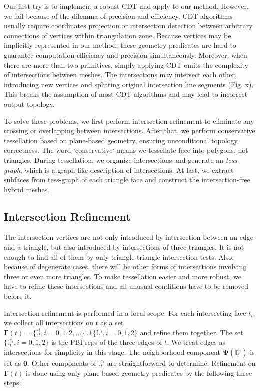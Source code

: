 \documentclass[10pt,journal,compsoc]{IEEEtran}
\begin{document}
Our first try is to implement a robust CDT and apply to our method. However, we fail because of the dilemma of precision and efficiency. CDT algorithms \cite{chew1989constrained,preparata2012computational} usually require coordinates projection or intersection detection between arbitrary connections of vertices within triangulation zone. Because vertices may be implicitly represented in our method, these geometry predicates are hard to guarantee computation efficiency and precision simultaneously. Moreover, when there are more than two primitives, simply applying CDT omits the complexity of intersections between meshes. The intersections may intersect each other, introducing new vertices and splitting original intersection line segments (Fig. x). This breaks the assumption of most CDT algorithms and may lead to incorrect output topology.

To solve these problems, we first perform intersection refinement to eliminate any crossing or overlapping between intersections. After that, we perform conservative tessellation based on plane-based geometry, ensuring unconditional topology correctness. The word `conservative` means we tessellate face into polygons, not triangles. During tessellation, we organize intersections and generate an \emph{tess-graph}, which is a graph-like description of intersections. At last, we extract subfaces from tess-graph of each triangle face and construct the intersection-free hybrid meshes.

\subsection{Intersection Refinement}


The intersection vertices are not only introduced by intersection between an edge and a triangle, but also introduced by intersections of three triangles. It is not enough to find all of them by only triangle-triangle intersection tests. Also, because of degenerate cases, there will be other forms of intersections involving three or even more triangles. To make tessellation easier and more robust, we have to refine these intersections and all unusual conditions have to be removed before it.

Intersection refinement is performed in a local scope. For each intersecting face $t_i$, we collect all intersections on $t$ as a set $\bm{\Gamma}(t)=\{\mathbb{I}_{t}^i, i=0,1,2,...\}\cup\{\mathbb{I}_{t}^{e_i},i=0,1,2\}$ and refine them together. The set $\{\mathbb{I}_{t}^{e_i},i=0,1,2\}$ is the PBI-reps of the three edges of $t$. We treat edges as intersections for simplicity in this stage. The neighborhood component $\bm{\Psi}(\mathbb{I}_{t}^{e_i})$ is set as $\bm{0}$. Other components of $\mathbb{I}_{t}^{e_i}$ are straightforward to determine. Refinement on $\bm{\Gamma}(t)$ is done using only plane-based geometry predicates by the following three steps:
\end{document}
